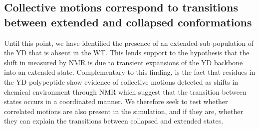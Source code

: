 \begin{figure}
\centering     %
{}
\end{figure}

\subsection{Collective motions correspond to transitions between extended and collapsed conformations}

Until this point, we have identified the presence of an extended sub-population of the YD \gct that is absent in the WT. This lends support to the hypothesis that the shift in \diffusion measured by NMR is due to transient expansions of the YD backbone into an extended state. Complementary to this finding, is the fact that residues in the YD polypeptide show evidence of collective motions detected as shifts in chemical environment through NMR  which suggest that the transition between states occurs in a coordinated manner. We therefore seek to test whether correlated motions are also present in the simulation, and if they are, whether they can explain the transitions between collapsed and extended states.

